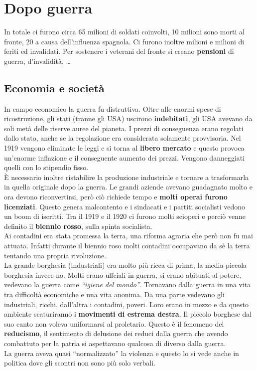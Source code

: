 
\section{Dopo guerra}
In totale ci furono circa 65 milioni di soldati coinvolti, 10 milioni sono morti al fronte, 20 a 
causa dell'influenza spagnola. Ci furono inoltre milioni e milioni di feriti ed invalidati. Per 
sostenere i veterani del fronte si creano \textbf{pensioni} di guerra, d'invalidità, \dots

\subsection{Economia e società}
In campo economico la guerra fu distruttiva. Oltre alle enormi spese di ricostruzione, gli stati 
(tranne gli USA) uscirono \textbf{indebitati}, gli USA avevano da soli metà delle riserve auree del 
pianeta. I prezzi di conseguenza erano regolati dallo stato, anche se la regolazione era considerata
solamente provvisoria. Nel 1919 vengono eliminate le leggi e si torna al \textbf{libero mercato} e 
questo provoca un'enorme inflazione e il conseguente aumento dei prezzi. Vengono danneggiati quelli
con lo stipendio fisso.\\
È necessario inoltre ristabilire la produzione industriale e tornare a trasformarla in quella 
originale dopo la guerra. Le grandi aziende avevano guadagnato molto e ora devono riconvertirsi,
però ciò richiede tempo e \textbf{molti operai furono licenziati}. Questo genera malcontento e i 
sindacati e i partiti socialisti vedono un boom di iscritti. Tra il 1919 e il 1920 ci furono molti
scioperi e perciò venne definito il \textbf{biennio rosso}, sulla spinta socialista.\\
Ai contadini era stata promessa la terra, una riforma agraria che però non fu mai attuata. Infatti
durante il biennio roso molti contadini occupavano da sè la terra tentando una propria rivoluzione.\\
La grande borghesia (industriali) era molto più ricca di prima, la media-piccola borghesia invece no.
Molti erano uffciali in guerra, si erano abituati al potere, vedevano la guerra come \textit{``igiene
del mondo''}. Tornavano dalla guerra in una vita tra difficoltà economiche e una vita anonima. Da
una parte vedevano gli industriali, ricchi, dall'altra i contadini, poveri. Loro erano in mezzo e
da questo ambiente scaturiranno i \textbf{movimenti di estrema destra}. Il piccolo borghese dal
suo canto non voleva uniformarsi al proletario. Questo è il fenomeno del \textbf{reducismo}, il
sentimento di delusione dei reduci dalla guerra che avendo combattuto per la patria si aspettavano
qualcosa di diverso dalla guerra.\\
La guerra aveva quasi ``normalizzato'' la violenza e questo lo si vede anche in politica dove gli
scontri non sono più solo verbali.

